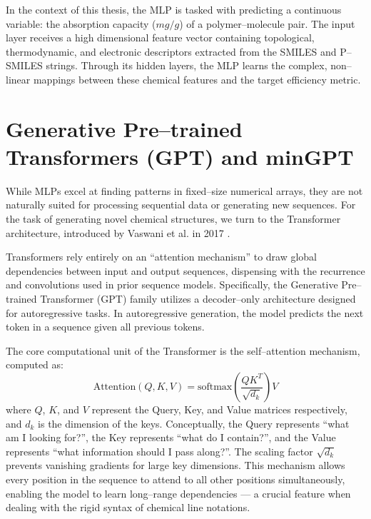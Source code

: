 In the context of this thesis, the MLP is tasked with predicting a continuous variable: the absorption capacity ($mg/g$) of a polymer--molecule pair. The input layer receives a high dimensional feature vector containing topological, thermodynamic, and electronic descriptors extracted from the SMILES and P--SMILES strings. Through its hidden layers, the MLP learns the complex, non--linear mappings between these chemical features and the target efficiency metric.

\section{Generative Pre--trained Transformers (GPT) and minGPT}
\label{sec:mingpt}

While MLPs excel at finding patterns in fixed--size numerical arrays, they are not naturally suited for processing sequential data or generating new sequences. For the task of generating novel chemical structures, we turn to the Transformer architecture, introduced by Vaswani et al. in 2017 \cite{vaswani2017attention}.

Transformers rely entirely on an ``attention mechanism'' to draw global dependencies between input and output sequences, dispensing with the recurrence and convolutions used in prior sequence models. Specifically, the Generative Pre--trained Transformer (GPT) family \cite{radford2018improving} utilizes a decoder--only architecture designed for autoregressive tasks.  In autoregressive generation, the model predicts the next token in a sequence given all previous tokens.

The core computational unit of the Transformer is the self--attention mechanism, computed as:
\begin{equation}
	\text{Attention}(Q, K, V) = \text{softmax}\left(\frac{QK^T}{\sqrt{d_k}}\right)V
\end{equation}
where $Q$, $K$, and $V$ represent the Query, Key, and Value matrices respectively, and $d_k$ is the dimension of the keys. Conceptually, the Query represents ``what am I looking for?'', the Key represents ``what do I contain?'', and the Value represents ``what information should I pass along?''. The scaling factor $\sqrt{d_k}$ prevents vanishing gradients for large key dimensions. This mechanism allows every position in the sequence to attend to all other positions simultaneously, enabling the model to learn long--range dependencies — a crucial feature when dealing with the rigid syntax of chemical line notations.

